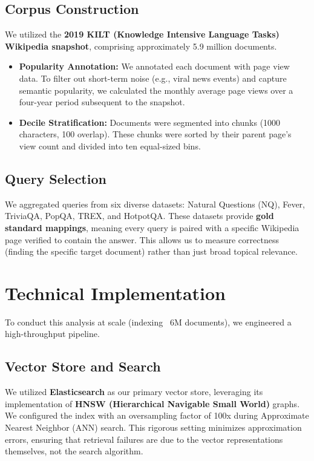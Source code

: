 \documentclass{article}
\begin{document}
\subsection{Corpus Construction}
We utilized the \textbf{2019 KILT (Knowledge Intensive Language Tasks) Wikipedia snapshot}, comprising approximately 5.9 million documents.
\begin{itemize}
    \item \textbf{Popularity Annotation:} We annotated each document with page view data. To filter out short-term noise (e.g., viral news events) and capture semantic popularity, we calculated the monthly average page views over a four-year period subsequent to the snapshot.
    \item \textbf{Decile Stratification:} Documents were segmented into chunks (1000 characters, 100 overlap). These chunks were sorted by their parent page's view count and divided into ten equal-sized bins.
\end{itemize}

\subsection{Query Selection}
We aggregated queries from six diverse datasets: Natural Questions (NQ), Fever, TriviaQA, PopQA, TREX, and HotpotQA. These datasets provide \textbf{gold standard mappings}, meaning every query is paired with a specific Wikipedia page verified to contain the answer. This allows us to measure correctness (finding the specific target document) rather than just broad topical relevance.

\section{Technical Implementation}

To conduct this analysis at scale (indexing ~6M documents), we engineered a high-throughput pipeline.

\subsection{Vector Store and Search}
We utilized \textbf{Elasticsearch} as our primary vector store, leveraging its implementation of \textbf{HNSW (Hierarchical Navigable Small World)} graphs. We configured the index with an oversampling factor of 100x during Approximate Nearest Neighbor (ANN) search. This rigorous setting minimizes approximation errors, ensuring that retrieval failures are due to the vector representations themselves, not the search algorithm.
\end{document}
